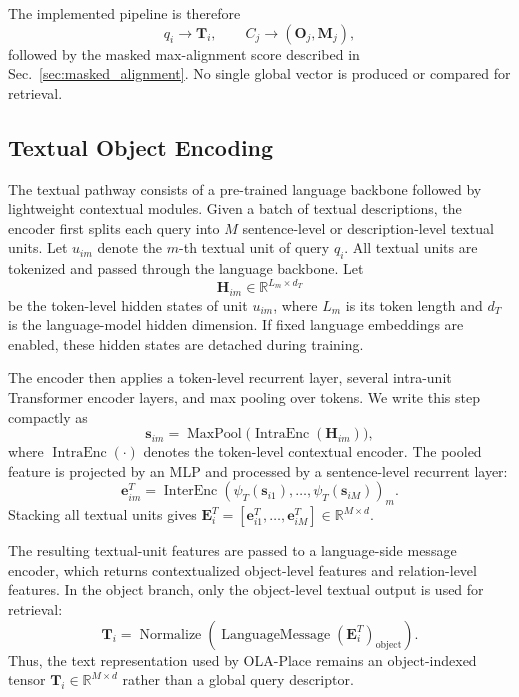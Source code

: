 \documentclass{article}
\begin{document}
The implemented pipeline is therefore
\begin{equation}
q_i \rightarrow \mathbf{T}_i,
\qquad
C_j \rightarrow (\mathbf{O}_j,\mathbf{M}_j),
\end{equation}
followed by the masked max-alignment score described in Sec.~\ref{sec:masked_alignment}. No single global vector is produced or compared for retrieval.

\subsection{Textual Object Encoding}

The textual pathway consists of a pre-trained language backbone followed by lightweight contextual modules. Given a batch of textual descriptions, the encoder first splits each query into $M$ sentence-level or description-level textual units. Let $u_{im}$ denote the $m$-th textual unit of query $q_i$. All textual units are tokenized and passed through the language backbone. Let
\begin{equation}
\mathbf{H}_{im}\in\mathbb{R}^{L_m\times d_T}
\end{equation}
be the token-level hidden states of unit $u_{im}$, where $L_m$ is its token length and $d_T$ is the language-model hidden dimension. If fixed language embeddings are enabled, these hidden states are detached during training.

The encoder then applies a token-level recurrent layer, several intra-unit Transformer encoder layers, and max pooling over tokens. We write this step compactly as
\begin{equation}
\mathbf{s}_{im}=\operatorname{MaxPool}\bigl(\operatorname{IntraEnc}(\mathbf{H}_{im})\bigr),
\end{equation}
where $\operatorname{IntraEnc}(\cdot)$ denotes the token-level contextual encoder. The pooled feature is projected by an MLP and processed by a sentence-level recurrent layer:
\begin{equation}
\mathbf{e}^{T}_{im}=\operatorname{InterEnc}\left(\psi_T(\mathbf{s}_{i1}),\ldots,\psi_T(\mathbf{s}_{iM})\right)_m.
\end{equation}
Stacking all textual units gives $\mathbf{E}^{T}_i=[\mathbf{e}^{T}_{i1},\ldots,\mathbf{e}^{T}_{iM}]\in\mathbb{R}^{M\times d}$.

The resulting textual-unit features are passed to a language-side message encoder, which returns contextualized object-level features and relation-level features. In the object branch, only the object-level textual output is used for retrieval:
\begin{equation}
\mathbf{T}_i=\operatorname{Normalize}\left(\operatorname{LanguageMessage}(\mathbf{E}^{T}_i)_{\mathrm{object}}\right).
\end{equation}
Thus, the text representation used by OLA-Place remains an object-indexed tensor $\mathbf{T}_i\in\mathbb{R}^{M\times d}$ rather than a global query descriptor.
\end{document}
